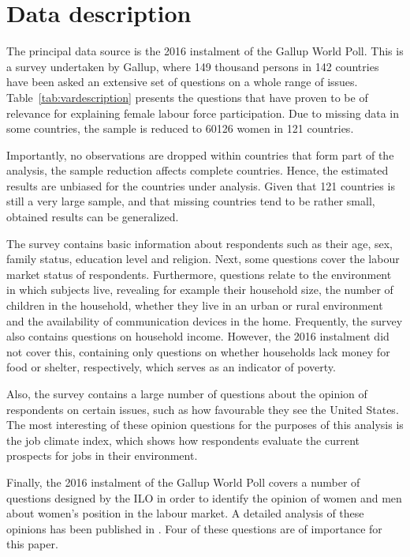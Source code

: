 \section{Data description}\label{sec:data}

The principal data source is the 2016 instalment of the Gallup World Poll. This is a survey undertaken by Gallup, where 149 thousand persons in 142 countries have been asked an extensive set of questions on a whole range of issues. Table~\ref{tab:vardescription} presents the questions that have proven to be of relevance for explaining female labour force participation. Due to missing data in some countries, the sample is reduced to 60126 women in 121 countries.

Importantly, no observations are dropped within countries that form part of the analysis, the sample reduction affects complete countries. Hence, the estimated results are unbiased for the countries under analysis. Given that 121 countries is still a very large sample, and that missing countries tend to be rather small, obtained results can be generalized.



The survey contains basic information about respondents such as their age, sex, family status, education level and religion. Next, some questions cover the labour market status of respondents. Furthermore, questions relate to the environment in which subjects live, revealing for example their household size, the number of children in the household, whether they live in an urban or rural environment and the availability of communication devices in the home. Frequently, the survey also contains questions on household income. However, the 2016 instalment did not cover this, containing only questions on whether households lack money for food or shelter, respectively, which serves as an indicator of poverty. 

Also, the survey contains a large number of questions about the opinion of respondents on certain issues, such as how favourable they see the United States. The most interesting of these opinion questions for the purposes of this analysis is the job climate index, which shows how respondents evaluate the current prospects for jobs in their environment.

Finally, the 2016 instalment of the Gallup World Poll covers a number of questions designed by the ILO in order to identify the opinion of women and men about women's position in the labour market. A detailed analysis of these opinions has been published in \citet{ilogallup2017}. Four of these questions are of importance for this paper. 


